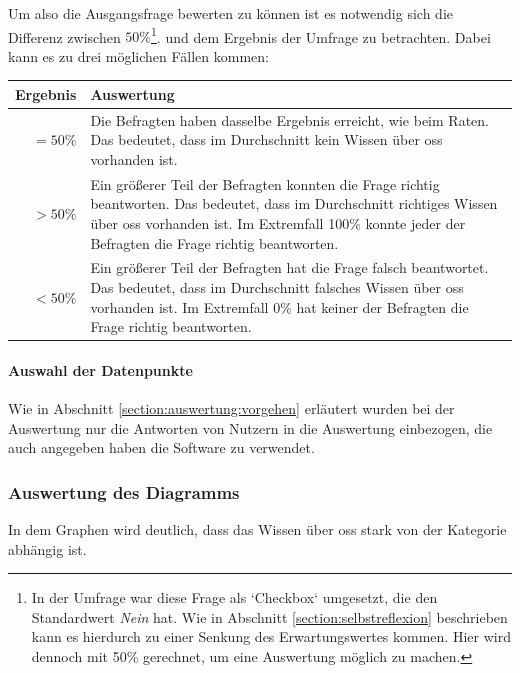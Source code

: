 \documentclass[a4paper]{article}
\begin{document}
                    Um also die Ausgangsfrage bewerten zu können ist es notwendig sich die Differenz zwischen $50\%$\footnote{In der Umfrage war diese Frage als `Checkbox` umgesetzt, die den Standardwert \emph{Nein} hat. Wie in Abschnitt \ref{section:selbstreflexion} beschrieben kann es hierdurch zu einer Senkung des Erwartungswertes kommen. Hier wird dennoch mit 50\% gerechnet, um eine Auswertung möglich zu machen.}. und dem Ergebnis der Umfrage zu betrachten. Dabei kann es zu drei möglichen Fällen kommen:\\
            
                    \begin{tabularx}{\textwidth}{rX}
                        \textbf{Ergebnis} & \textbf{Auswertung} \\\hline
                        $= 50 \%$ & Die Befragten haben dasselbe Ergebnis erreicht, wie beim Raten. Das bedeutet, dass im Durchschnitt kein Wissen über \gls{oss} vorhanden ist.\\
                        $> 50 \%$ & Ein größerer Teil der Befragten konnten die Frage richtig beantworten. Das bedeutet, dass im Durchschnitt richtiges Wissen über \gls{oss} vorhanden ist. Im Extremfall 100\% konnte jeder der Befragten die Frage richtig beantworten.\\
                        $< 50 \%$ & Ein größerer Teil der Befragten hat die Frage falsch beantwortet. Das bedeutet, dass im Durchschnitt falsches Wissen über \gls{oss} vorhanden ist. Im Extremfall 0\% hat keiner der Befragten die Frage richtig beantworten.  
                    \end{tabularx}
            
                \paragraph{Auswahl der Datenpunkte}
                    Wie in Abschnitt \ref{section:auswertung:vorgehen} erläutert wurden bei der Auswertung nur die Antworten von Nutzern in die Auswertung einbezogen, die auch angegeben haben die Software zu verwendet.
                                        
            \subsubsection{Auswertung des Diagramms}\label{section:knowledge_analysis}
                In dem Graphen wird deutlich, dass das Wissen über \gls{oss} stark von der Kategorie abhängig ist. %
            
\end{document}
